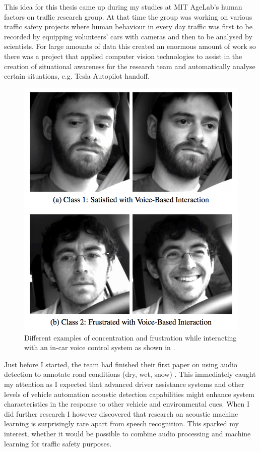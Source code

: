 
This idea for this thesis came up during my studies at MIT AgeLab's human factors on traffic research group. At that time the group was working on various traffic safety projects where human behaviour in every day traffic was first to be recorded by equipping volunteers' cars with cameras and then to be analysed by scientists. For large amounts of data this created an enormous amount of work so there was a project that applied computer vision technologies to assist in the creation of situational awareness for the research team and automatically analyse certain situations, e.g. Tesla Autopilot handoff. 


\begin{figure}[h]
    \centering
	\includegraphics[width=.85\textwidth]{./images/illustrations/driver-frustration}
    \caption{Different examples of concentration and frustration while interacting with an in-car voice control system as shown in \cite{Abdic:2016:DFD:3060621.3060809}.}
    \label{fig:am}
\end{figure}


Just before I started, the team had finished their first paper on using audio detection to annotate road conditions (dry, wet, snow) \cite{Abdic:2016:DFD:3060621.3060809}. This immediately caught my attention as I expected that advanced driver assistance systems and other levels of vehicle automation acoustic detection capabilities might enhance system characteristics in the response to other vehicle and environmental cues. When I did further research I however discovered that research on acoustic machine learning is surprisingly rare apart from speech recognition. This sparked my interest, whether it would be possible to combine audio processing and machine learning for traffic safety purposes. 


